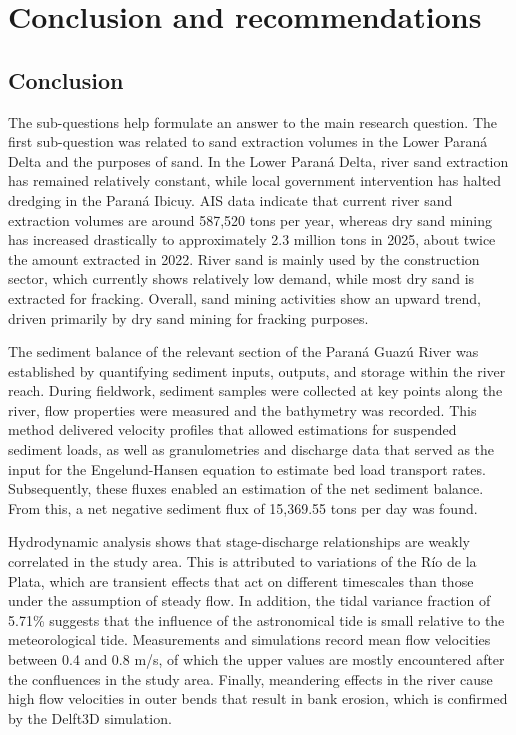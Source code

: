 \chapter{Conclusion and recommendations}
\label{chapter:conclusion}
\section{Conclusion}
The sub-questions help formulate an answer to the main research question. The first sub-question was related to sand extraction volumes in the Lower Paraná Delta and the purposes of sand. In the Lower Paraná Delta, river sand extraction has remained relatively constant, while local government intervention has halted dredging in the Paraná Ibicuy. AIS data indicate that current river sand extraction volumes are around 587,520 tons per year, whereas dry sand mining has increased drastically to approximately 2.3 million tons in 2025, about twice the amount extracted in 2022. River sand is mainly used by the construction sector, which currently shows relatively low demand, while most dry sand is extracted for fracking. Overall, sand mining activities show an upward trend, driven primarily by dry sand mining for fracking purposes.

The sediment balance of the relevant section of the Paraná Guazú River was established by quantifying sediment inputs, outputs, and storage within the river reach. During fieldwork, sediment samples were collected at key points along the river, flow properties were measured and the bathymetry was recorded. This method delivered velocity profiles that allowed estimations for suspended sediment loads, as well as granulometries and discharge data that served as the input for the Engelund-Hansen equation to estimate bed load transport rates. Subsequently, these fluxes enabled an estimation of the net sediment balance. From this, a net negative sediment flux of 15,369.55 tons per day was found.


Hydrodynamic analysis shows that stage-discharge relationships are weakly correlated in the study area. This is attributed to variations of the Río de la Plata, which are transient effects that act on different timescales than those under the assumption of steady flow. In addition, the tidal variance fraction of 5.71\% suggests that the influence of the astronomical tide is small relative to the meteorological tide. Measurements and simulations record mean flow velocities between 0.4 and 0.8 m/s, of which the upper values are mostly encountered after the confluences in the study area. Finally, meandering effects in the river cause high flow velocities in outer bends that result in bank erosion, which is confirmed by the Delft3D simulation. 

